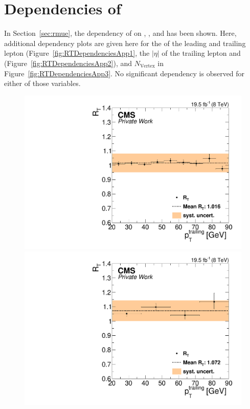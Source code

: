 \chapter{Dependencies of \RT}
\label{app:RT}
In Section~\ref{sec:rmue}, the dependency of \RT on \mll, \njets, and \MET has been shown. Here, additional dependency plots are given here for the \pt of the leading and trailing lepton (Figure~\ref{fig:RTDependenciesApp1}, the $|\eta|$ of the trailing lepton and \HT (Figure~\ref{fig:RTDependenciesApp2}), and $N_{\text{Vertex}}$ in Figure~\ref{fig:RTDependenciesApp3}. No significant dependency is observed for either of those variables.

\begin{figure}[htbp]
\centering
\begin{minipage}[t]{0.49\textwidth}
  \includegraphics[width=\textwidth]{plots/BG/trigger/Triggereff_SFvsOF_Syst_AlphaT_HighHTExclusiveCentral_Full2012_TrailingPt_leadingPt20.pdf}
\end{minipage}
\begin{minipage}[t]{0.49\textwidth}
\includegraphics[width=\textwidth]{plots/BG/trigger/Triggereff_SFvsOF_Syst_AlphaT_HighHTExclusiveForward_Full2012_TrailingPt_leadingPt20.pdf}

\end{minipage}
\end{figure}
